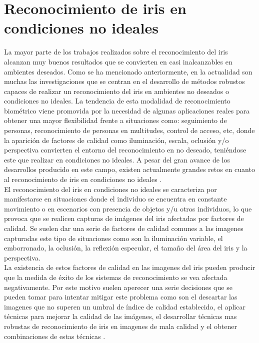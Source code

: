 \section{Reconocimiento de iris en condiciones no ideales}

La mayor parte de los trabajos realizados sobre el reconocimiento del iris alcanzan muy buenos resultados que se convierten en casi inalcanzables en ambientes deseados. Como se ha mencionado anteriormente, en la actualidad son muchas las investigaciones que se centran en el desarrollo de métodos robustos capaces de realizar un reconocimiento del iris en ambientes no deseados o condiciones no ideales. La tendencia de esta modalidad de reconocimiento biométrico viene promovida por la necesidad de algunas aplicaciones reales para obtener una mayor flexibilidad frente a situaciones como: seguimiento de personas, reconocimiento de personas en multitudes, control de acceso, etc, donde la aparición de factores de calidad como iluminación, escala, oclusión y/o perspectiva convierten el entorno del reconocimiento en no deseado, teniéndose este que realizar en condiciones no ideales. A pesar del gran avance de los desarrollos producido en este campo, existen actualmente grandes retos en cuanto al reconocimiento de iris en condiciones no ideales \cite{Reference9}.\\

El reconocimiento del iris en condiciones no ideales se caracteriza por manifestarse en situaciones donde el individuo se encuentra en constante movimiento o en escenarios con presencia de objetos y/u otros individuos, lo que provoca que se realicen capturas de imágenes del iris afectadas por factores de calidad. Se suelen dar una serie de factores de calidad comunes a las imagenes capturadas este tipo de situaciones como son la iluminación variable, el emborronado, la oclusión, la reflexión especular, el tamaño del área del iris y la perspectiva. \\
 
La existencia de estos factores de calidad en las imagenes del iris pueden producir que la medida de éxito de los sistemas de reconocimiento se vea afectada negativamente. Por este motivo suelen aperecer una serie decisiones que se pueden tomar para intentar mitigar este problema como son el descartar las imagenes que no superen un umbral de índice de calidad establecido, el aplicar técnicas para mejorar la calidad de las imágenes, el desarrollar técnicas mas robustas de reconocimiento de iris en imagenes de mala calidad y el obtener combinaciones de estas técnicas \cite{Reference9}.\\

